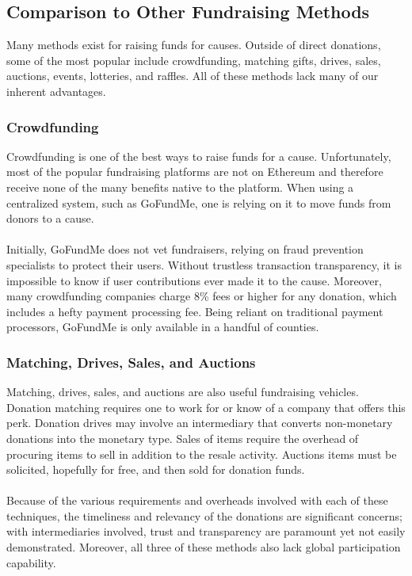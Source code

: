 \documentclass[11pt]{article}
\begin{document}
\subsection{Comparison to Other Fundraising Methods}

Many methods exist for raising funds for causes. Outside of direct donations, some of the most popular include crowdfunding, matching gifts, drives, sales, auctions, events, lotteries, and raffles. All of these methods lack many of our inherent advantages.

\subsubsection{Crowdfunding}

Crowdfunding is one of the best ways to raise funds for a cause. Unfortunately, most of the popular fundraising platforms are not on Ethereum and therefore receive none of the many benefits native to the platform. When using a centralized system, such as GoFundMe, one is relying on it to move funds from donors to a cause.\\\\
Initially, GoFundMe does not vet fundraisers, relying on fraud prevention specialists to protect their users. Without trustless transaction transparency, it is impossible to know if user contributions ever made it to the cause. Moreover, many crowdfunding companies charge 8\% fees or higher for any donation, which includes a hefty payment processing fee. Being reliant on traditional payment processors, GoFundMe is only available in a handful of counties.

\subsubsection{Matching, Drives, Sales, and Auctions}

Matching, drives, sales, and auctions are also useful fundraising vehicles. Donation matching requires one to work for or know of a company that offers this perk. Donation drives may involve an intermediary that converts non-monetary donations into the monetary type. Sales of items require the overhead of procuring items to sell in addition to the resale activity. Auctions items must be solicited, hopefully for free, and then sold for donation funds.\\\\
Because of the various requirements and overheads involved with each of these techniques, the timeliness and relevancy of the donations are significant concerns; with intermediaries involved, trust and transparency are paramount yet not easily demonstrated. Moreover, all three of these methods also lack global participation capability.
\end{document}
